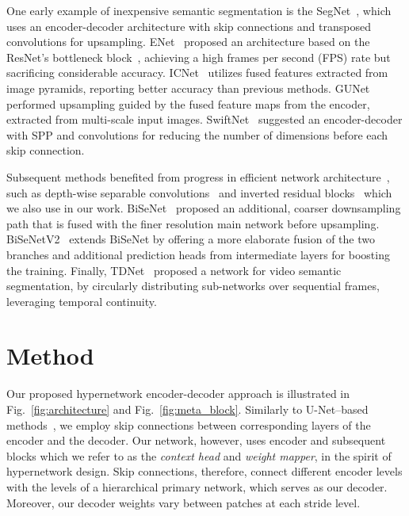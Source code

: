 \documentclass[final]{cvpr}
\newcommand{\minisection}[1]{\vspace{2mm}\noindent{\textbf{#1}.}}
\begin{document}
One early example of inexpensive semantic segmentation is the SegNet~\cite{badrinarayanan2017segnet}, which uses an encoder-decoder architecture with skip connections and transposed convolutions for upsampling. ENet~\cite{paszke2016enet} proposed an architecture based on the ResNet's bottleneck block~\cite{he2016deep}, achieving a high frames per second (FPS) rate but sacrificing considerable accuracy. ICNet~\cite{zhao2018icnet} utilizes fused features extracted from image pyramids, reporting better accuracy than previous methods. GUNet~\cite{mazzini2018guided} performed upsampling guided by the fused feature maps from the encoder, extracted from multi-scale input images. SwiftNet~\cite{orsic2019defense} suggested an encoder-decoder with SPP and  convolutions for reducing the number of dimensions before each skip connection.

Subsequent methods benefited from progress in efficient network architecture~\cite{li2019dfanet,yu2020bisenet}, such as depth-wise separable convolutions~\cite{chollet2017xception,howard2017mobilenets} and inverted residual blocks~\cite{sandler2018mobilenetv2} which we also use in our work. BiSeNet~\cite{yu2018bisenet} proposed an additional, coarser downsampling path that is fused with the finer resolution main network before upsampling. BiSeNetV2~\cite{yu2020bisenet} extends BiSeNet by offering a more elaborate fusion of the two branches and additional prediction heads from intermediate layers for boosting the training. Finally, TDNet~\cite{hu2020temporally} proposed a network for video semantic segmentation, by circularly distributing sub-networks over sequential frames, leveraging temporal continuity.



\section{Method}
\minisection{Overview}
\label{sec:Method overview}
Our proposed hypernetwork encoder-decoder approach is illustrated in Fig.~\ref{fig:architecture} and Fig.~\ref{fig:meta_block}. Similarly to U-Net--based methods~\cite{ronneberger2015u}, we employ skip connections between corresponding layers of the encoder and the decoder. Our network, however, uses encoder and subsequent blocks which we refer to as the {\em context head} and {\em weight mapper}, in the spirit of hypernetwork design. Skip connections, therefore, connect different encoder levels with the levels of a hierarchical primary network, which serves as our decoder. Moreover, our decoder weights vary between patches at each stride level.
\end{document}
